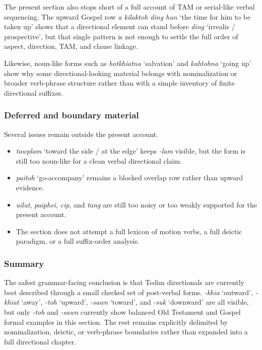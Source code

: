 \documentclass[
  11pt,
  a4paper,
]{article}
\providecommand{\tightlist}{%
  \setlength{\itemsep}{0pt}\setlength{\parskip}{0pt}}
\newcommand{\tdim}[1]{\textit{#1}}
\newcommand{\glossquote}[1]{`#1'}
\begin{document}
The present section also stops short of a full account of TAM or
serial-like verbal sequencing. The upward Gospel row
\tdim{a kilaktoh ding hun} \glossquote{the time for him to be taken up}
shows that a directional element can stand before \tdim{ding}
\glossquote{irrealis / prospective}, but that single pattern is not
enough to settle the full order of aspect, direction, TAM, and clause
linkage.

Likewise, noun-like forms such as \tdim{hotkhiatna}
\glossquote{salvation} and \tdim{kahtohna} \glossquote{going up} show
why some directional-looking material belongs with nominalization or
broader verb-phrase structure rather than with a simple inventory of
finite directional suffixes.

\subsubsection{Deferred and boundary
material}\label{deferred-and-boundary-material-5}

Several issues remain outside the present account.

\begin{itemize}
\tightlist
\item
  \tdim{tawplam} \glossquote{toward the side / at the edge} keeps
  \tdim{-lam} visible, but the form is still too noun-like for a clean
  verbal directional claim.
\item
  \tdim{paitoh} \glossquote{go-accompany} remains a blocked overlap row
  rather than upward evidence.
\item
  \tdim{uilut}, \tdim{paiphei}, \tdim{cip}, and \tdim{tang} are still
  too noisy or too weakly supported for the present account.
\item
  The section does not attempt a full lexicon of motion verbs, a full
  deictic paradigm, or a full suffix-order analysis.
\end{itemize}

\subsubsection{Summary}\label{summary-6}

The safest grammar-facing conclusion is that Tedim directionals are
currently best described through a small checked set of post-verbal
forms. \tdim{-khia} \glossquote{outward}, \tdim{-khiat}
\glossquote{away}, \tdim{-toh} \glossquote{upward}, \tdim{-sawn}
\glossquote{toward}, and \tdim{-suk} \glossquote{downward} are all
visible, but only \tdim{-toh} and \tdim{-sawn} currently show balanced
Old Testament and Gospel formal examples in this section. The rest
remains explicitly delimited by nominalization, deictic, or verb-phrase
boundaries rather than expanded into a full directional chapter.
\end{document}

